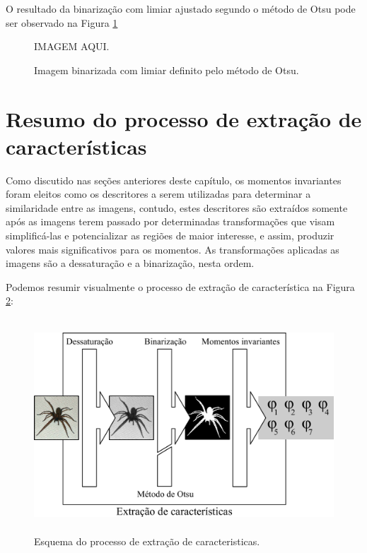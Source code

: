O resultado da binarização com limiar ajustado segundo o método de Otsu pode
ser observado na Figura \ref{fig:bin_otsu}

\begin{figure}[H]
  \begin{center}
    IMAGEM AQUI.
  \end{center}
  \caption{ Imagem binarizada com limiar definito pelo método de Otsu. }
  \label{fig:bin_otsu}
\end{figure}

\section{Resumo do processo de extração de características}
\label{sec:resumo_extracao_caracteristicas}

Como discutido nas seções anteriores deste capítulo, os momentos invariantes
foram eleitos como os descritores a serem utilizadas para determinar a
similaridade entre as imagens, contudo, estes descritores são extraídos somente
após as imagens terem passado por determinadas transformações que visam
simplificá-las e potencializar as regiões de maior interesse, e assim, produzir
valores mais significativos para os momentos. As transformações  aplicadas as
imagens são a dessaturação e a binarização, nesta ordem.

Podemos resumir visualmente o processo de extração de característica na
Figura \ref{fig:extracao_caracteristicas}:

\begin{figure}[H]
  \begin{center}
    \includegraphics[height=8cm]{imagens/extracao_caracteristicas.pdf}
  \end{center}
  \caption{ Esquema do processo de extração de caracteristicas. }
  \label{fig:extracao_caracteristicas}
\end{figure}
